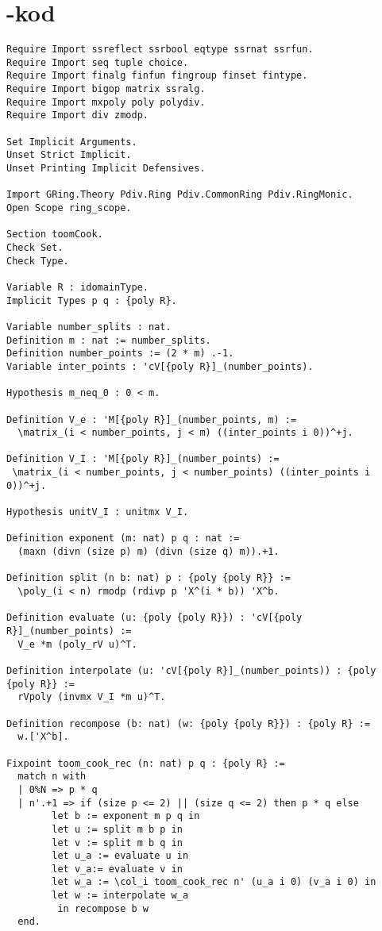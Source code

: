 \section{\coq{}-kod}
\label{sec:coqkod}
\begin{lstlisting}
Require Import ssreflect ssrbool eqtype ssrnat ssrfun.
Require Import seq tuple choice.
Require Import finalg finfun fingroup finset fintype.
Require Import bigop matrix ssralg.
Require Import mxpoly poly polydiv.
Require Import div zmodp.

Set Implicit Arguments.
Unset Strict Implicit.
Unset Printing Implicit Defensives.

Import GRing.Theory Pdiv.Ring Pdiv.CommonRing Pdiv.RingMonic.
Open Scope ring_scope.

Section toomCook.
Check Set.
Check Type.

Variable R : idomainType.
Implicit Types p q : {poly R}.

Variable number_splits : nat.
Definition m : nat := number_splits.
Definition number_points := (2 * m) .-1.
Variable inter_points : 'cV[{poly R}]_(number_points).

Hypothesis m_neq_0 : 0 < m.

Definition V_e : 'M[{poly R}]_(number_points, m) :=
  \matrix_(i < number_points, j < m) ((inter_points i 0))^+j.

Definition V_I : 'M[{poly R}]_(number_points) :=
 \matrix_(i < number_points, j < number_points) ((inter_points i 0))^+j.

Hypothesis unitV_I : unitmx V_I.

Definition exponent (m: nat) p q : nat :=
  (maxn (divn (size p) m) (divn (size q) m)).+1.

Definition split (n b: nat) p : {poly {poly R}} :=
  \poly_(i < n) rmodp (rdivp p 'X^(i * b)) 'X^b.

Definition evaluate (u: {poly {poly R}}) : 'cV[{poly R}]_(number_points) :=
  V_e *m (poly_rV u)^T.

Definition interpolate (u: 'cV[{poly R}]_(number_points)) : {poly {poly R}} :=
  rVpoly (invmx V_I *m u)^T.

Definition recompose (b: nat) (w: {poly {poly R}}) : {poly R} :=
  w.['X^b].

Fixpoint toom_cook_rec (n: nat) p q : {poly R} :=
  match n with
  | 0%N => p * q
  | n'.+1 => if (size p <= 2) || (size q <= 2) then p * q else
        let b := exponent m p q in
        let u := split m b p in
        let v := split m b q in
        let u_a := evaluate u in
        let v_a:= evaluate v in
        let w_a := \col_i toom_cook_rec n' (u_a i 0) (v_a i 0) in
        let w := interpolate w_a
         in recompose b w
  end.


\end{lstlisting}
